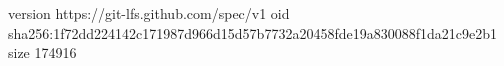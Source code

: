 version https://git-lfs.github.com/spec/v1
oid sha256:1f72dd224142c171987d966d15d57b7732a20458fde19a830088f1da21c9e2b1
size 174916
